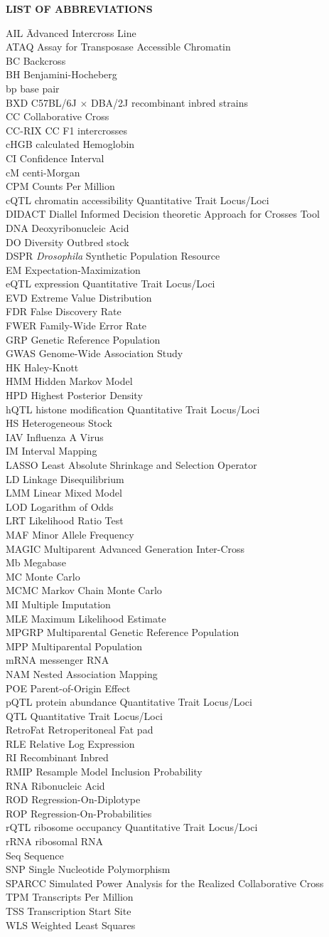 {}

\begin{center}
{\large \textbf{LIST OF ABBREVIATIONS}}
\end{center}

\newcommand{\Ab}[2]{\noindent  #1 \> #2 \\}
\newcommand{\Abi}[2]{\noindent #1 \hspace{1.5cm} \= #2 \\}

\begin{tabbing}
\Abi{AIL}{Advanced Intercross Line}
\Ab{ATAQ}{Assay for Transposase Accessible Chromatin}
\Ab{BC}{Backcross}
\Ab{BH}{Benjamini-Hocheberg}
\Ab{bp}{base pair}
\Ab{BXD}{C57BL/6J $\times$ DBA/2J recombinant inbred strains}
\Ab{CC}{Collaborative Cross}
\Ab{CC-RIX}{CC F1 intercrosses}
\Ab{cHGB}{calculated Hemoglobin}
\Ab{CI}{Confidence Interval}
\Ab{cM}{centi-Morgan}
\Ab{CPM}{Counts Per Million}
\Ab{cQTL}{chromatin accessibility Quantitative Trait Locus/Loci}
\Ab{DIDACT}{Diallel Informed Decision theoretic Approach for Crosses Tool}
\Ab{DNA}{Deoxyribonucleic Acid}
\Ab{DO}{Diversity Outbred stock}
\Ab{DSPR}{\textit{Drosophila} Synthetic Population Resource}
\Ab{EM}{Expectation-Maximization}
\Ab{eQTL}{expression Quantitative Trait Locus/Loci}
\Ab{EVD}{Extreme Value Distribution}
\Ab{FDR}{False Discovery Rate}
\Ab{FWER}{Family-Wide Error Rate}
\Ab{GRP}{Genetic Reference Population}
\Ab{GWAS}{Genome-Wide Association Study}
\Ab{HK}{Haley-Knott}
\Ab{HMM}{Hidden Markov Model}
\Ab{HPD}{Highest Posterior Density}
\Ab{hQTL}{histone modification Quantitative Trait Locus/Loci}
\Ab{HS}{Heterogeneous Stock}
\Ab{IAV}{Influenza A Virus}
\Ab{IM}{Interval Mapping}
\Ab{LASSO}{Least Absolute Shrinkage and Selection Operator}
\Ab{LD}{Linkage Disequilibrium}
\Ab{LMM}{Linear Mixed Model}
\Ab{LOD}{Logarithm of Odds}
\Ab{LRT}{Likelihood Ratio Test}
\Ab{MAF}{Minor Allele Frequency}
\Ab{MAGIC}{Multiparent Advanced Generation Inter-Cross}
\Ab{Mb}{Megabase}
\Ab{MC}{Monte Carlo}
\Ab{MCMC}{Markov Chain Monte Carlo}
\Ab{MI}{Multiple Imputation}
\Ab{MLE}{Maximum Likelihood Estimate}
\Ab{MPGRP}{Multiparental Genetic Reference Population}
\Ab{MPP}{Multiparental Population}
\Ab{mRNA}{messenger RNA}
\Ab{NAM}{Nested Association Mapping}
\Ab{POE}{Parent-of-Origin Effect}
\Ab{pQTL}{protein abundance Quantitative Trait Locus/Loci}
\Ab{QTL}{Quantitative Trait Locus/Loci}
\Ab{RetroFat}{Retroperitoneal Fat pad}
\Ab{RLE}{Relative Log Expression}
\Ab{RI}{Recombinant Inbred}
\Ab{RMIP}{Resample Model Inclusion Probability}
\Ab{RNA}{Ribonucleic Acid}
\Ab{ROD}{Regression-On-Diplotype}
\Ab{ROP}{Regression-On-Probabilities}
\Ab{rQTL}{ribosome occupancy Quantitative Trait Locus/Loci}
\Ab{rRNA}{ribosomal RNA}
\Ab{Seq}{Sequence}
\Ab{SNP}{Single Nucleotide Polymorphism}
\Ab{SPARCC}{Simulated Power Analysis for the Realized Collaborative Cross}
\Ab{TPM}{Transcripts Per Million}
\Ab{TSS}{Transcription Start Site}
\Ab{WLS}{Weighted Least Squares}
\end{tabbing}

\clearpage
